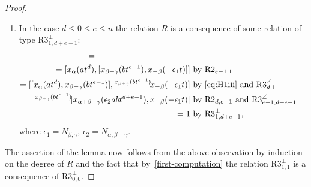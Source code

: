 \documentclass[oneside, 8pt]{amsart}
\theoremstyle{remark}
\theoremstyle{definition}
\numberwithin{lemma}{section}
\numberwithin{prop}{section}
\numberwithin{corollary}{section}
\numberwithin{externaltheorem}{section}
\numberwithin{equation}{section}
\begin{document}
\begin{proof}
\begin{enumerate}
\item In the case $d \leq 0 \leq e \leq n$ the relation $R$ is a consequence of some relation of type $\text{R3}^\bot_{1,d+e-1}$:
\begin{align*} [x_\alpha(at^d), x_{\gamma}(bt^{e})] = \hspace{4cm} \\ = [x_\alpha(at^d), [x_{\beta+\gamma}(b t^{e-1}), x_{-\beta}(-\epsilon_1 t)]] & \text{ by~$\text{R2}_{e-1,1}$ } \\
 = [[x_\alpha(at^d), x_{\beta+\gamma}(bt^{e-1})], {}^{x_{\beta+\gamma}(bt^{e-1})}\!x_{-\beta}(-\epsilon_1 t)] & \text{ by \eqref{eq:H1iii} and $\text{R3}^\angle_{d,1}$ } \\
 = {}^{x_{\beta+\gamma}(bt^{e-1})}\![x_{\alpha+\beta+\gamma}(\epsilon_2abt^{d+e-1}), x_{-\beta}(-\epsilon_1 t)] & \text{ by $\text{R2}_{d,e-1}$ and $\text{R3}^\angle_{e-1,d+e-1}$  } \\
 = 1 & \text{ by $\text{R3}^\bot_{1,d+e-1}$,} \end{align*}
where $\epsilon_1 = N_{\beta,\gamma}$, $\epsilon_2 = N_{\alpha,\beta+\gamma}$.
\end{enumerate}                                                           

The assertion of the lemma now follows from the above observation by induction on the degree of $R$ and the fact that by~\eqref{first-computation} the relation $\text{R3}^\bot_{1,1}$ is a consequence of $\text{R3}^\bot_{0,0}$.
\end{proof}
\end{document}

